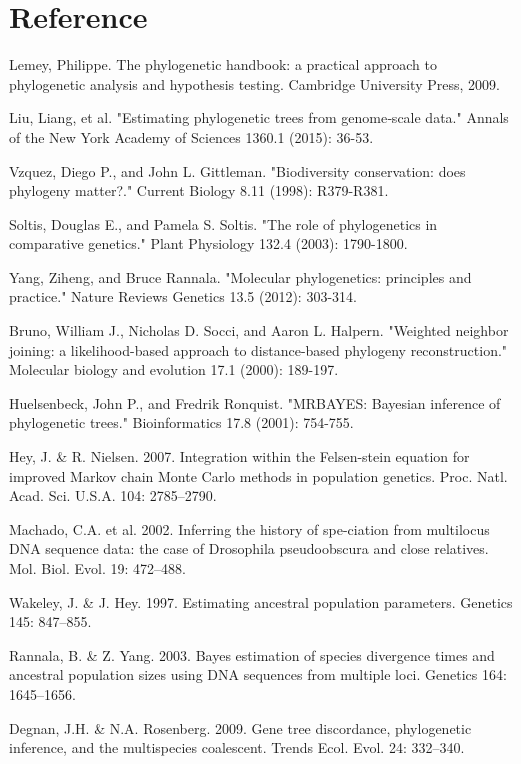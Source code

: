 \documentclass[preprint,12pt]{elsarticle}
\begin{document}
\section*{Reference}
\begin{thebibliography}{1}

\bibitem@
Lemey, Philippe. The phylogenetic handbook: a practical approach to phylogenetic analysis and hypothesis testing. Cambridge University Press, 2009.

\bibitem@
Liu, Liang, et al. "Estimating phylogenetic trees from genome‐scale data." Annals of the New York Academy of Sciences 1360.1 (2015): 36-53.

\bibitem@
Vzquez, Diego P., and John L. Gittleman. "Biodiversity conservation: does phylogeny matter?." Current Biology 8.11 (1998): R379-R381.

\bibitem@
Soltis, Douglas E., and Pamela S. Soltis. "The role of phylogenetics in comparative genetics." Plant Physiology 132.4 (2003): 1790-1800.

\bibitem@
Yang, Ziheng, and Bruce Rannala. "Molecular phylogenetics: principles and practice." Nature Reviews Genetics 13.5 (2012): 303-314.

\bibitem@
Bruno, William J., Nicholas D. Socci, and Aaron L. Halpern. "Weighted neighbor joining: a likelihood-based approach to distance-based phylogeny reconstruction." Molecular biology and evolution 17.1 (2000): 189-197.

\bibitem@
Huelsenbeck, John P., and Fredrik Ronquist. "MRBAYES: Bayesian inference of phylogenetic trees." Bioinformatics 17.8 (2001): 754-755.

\bibitem@
Hey, J. \& R. Nielsen. 2007. Integration within the Felsen-stein equation for improved Markov chain Monte Carlo methods in population genetics. Proc. Natl. Acad. Sci. U.S.A. 104: 2785–2790.

\bibitem@
Machado, C.A. et al. 2002. Inferring the history of spe-ciation from multilocus DNA sequence data: the case of Drosophila pseudoobscura and close relatives. Mol. Biol. Evol. 19: 472–488.

\bibitem@
Wakeley, J. \& J. Hey. 1997. Estimating ancestral population parameters. Genetics 145: 847–855.

\bibitem@
Rannala, B. \& Z. Yang. 2003. Bayes estimation of species divergence times and ancestral population sizes using DNA sequences from multiple loci. Genetics 164: 1645–1656.

\bibitem@
Degnan, J.H. \& N.A. Rosenberg. 2009. Gene tree discordance, phylogenetic inference, and the multispecies coalescent.    Trends Ecol. Evol. 24: 332–340.


\end{thebibliography}
\end{document}
